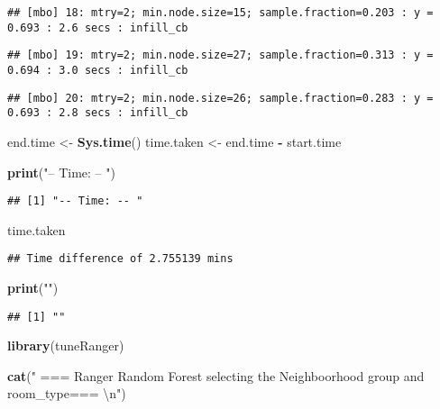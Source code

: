 \documentclass[
]{article}
\newenvironment{Shaded}{\begin{snugshade}}{\end{snugshade}}
\newcommand{\CharTok}[1]{\textcolor[rgb]{0.31,0.60,0.02}{#1}}
\newcommand{\KeywordTok}[1]{\textcolor[rgb]{0.13,0.29,0.53}{\textbf{#1}}}
\newcommand{\NormalTok}[1]{#1}
\newcommand{\OperatorTok}[1]{\textcolor[rgb]{0.81,0.36,0.00}{\textbf{#1}}}
\newcommand{\StringTok}[1]{\textcolor[rgb]{0.31,0.60,0.02}{#1}}
\begin{document}
\begin{verbatim}
## [mbo] 18: mtry=2; min.node.size=15; sample.fraction=0.203 : y = 0.693 : 2.6 secs : infill_cb
\end{verbatim}

\begin{verbatim}
## [mbo] 19: mtry=2; min.node.size=27; sample.fraction=0.313 : y = 0.694 : 3.0 secs : infill_cb
\end{verbatim}

\begin{verbatim}
## [mbo] 20: mtry=2; min.node.size=26; sample.fraction=0.283 : y = 0.693 : 2.8 secs : infill_cb
\end{verbatim}

\begin{Shaded}
\begin{Highlighting}[]
\NormalTok{end.time <-}\StringTok{ }\KeywordTok{Sys.time}\NormalTok{()}
\NormalTok{time.taken <-}\StringTok{ }\NormalTok{end.time }\OperatorTok{-}\StringTok{ }\NormalTok{start.time}

\KeywordTok{print}\NormalTok{(}\StringTok{"-- Time: -- "}\NormalTok{)}
\end{Highlighting}
\end{Shaded}

\begin{verbatim}
## [1] "-- Time: -- "
\end{verbatim}

\begin{Shaded}
\begin{Highlighting}[]
\NormalTok{time.taken}
\end{Highlighting}
\end{Shaded}

\begin{verbatim}
## Time difference of 2.755139 mins
\end{verbatim}

\begin{Shaded}
\begin{Highlighting}[]
\KeywordTok{print}\NormalTok{(}\StringTok{""}\NormalTok{)}
\end{Highlighting}
\end{Shaded}

\begin{verbatim}
## [1] ""
\end{verbatim}

\begin{Shaded}
\begin{Highlighting}[]
\KeywordTok{library}\NormalTok{(tuneRanger)}

\KeywordTok{cat}\NormalTok{(}\StringTok{" === Ranger Random Forest selecting the Neighboorhood group and room_type=== }\CharTok{\textbackslash{}n}\StringTok{"}\NormalTok{)}
\end{Highlighting}
\end{Shaded}
\end{document}
